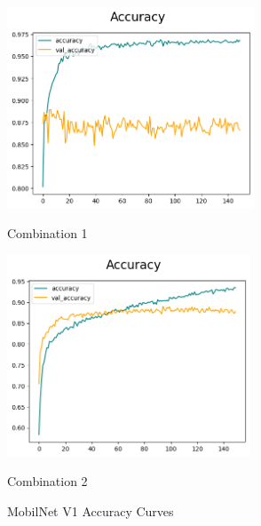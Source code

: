 \begin{figure}[H]
    \centering
    \begin{minipage}[b]{0.49\textwidth}
        \centering
        \includegraphics[width=\textwidth, height=6cm]{Figures/balanced_data/less_data/withoutbn/mn1/accuracy.png}
        \captionsetup{labelformat=empty}
        \caption{Combination 1}
        \label{fig:u_wo_r_a}
    \end{minipage}
    \hfill
    \begin{minipage}[b]{0.49\textwidth}
        \centering
        \includegraphics[width=\textwidth, height=6cm]{Figures/balanced_data/less_data/withbn/mn1/accuracy.png}
        \captionsetup{labelformat=empty}
        \caption{Combination 2}
        \label{fig:u_w_r_a}
    \end{minipage}
    \captionsetup{labelformat=default}
    \caption{MobilNet V1 Accuracy Curves}
\end{figure}


